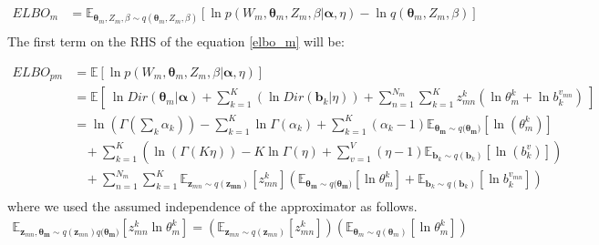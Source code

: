 \documentclass[a4]{article}
\begin{document}
\begin{equation}
\begin{aligned}
ELBO_m &= \mathbb{E}_{\bm{\theta}_m , Z_{m}, \beta \sim
                    q(\bm{\theta}_m , Z_{m}, \beta )}
            [    \ln p( W_m, \bm{\theta}_m, Z_m, \beta | \bm{\alpha}, \eta)
               - \ln q(\bm{\theta}_m , Z_{m}, \beta ) ]\label{elbo_m}\\
\end{aligned}
\end{equation}
The first term on the RHS of the equation \ref{elbo_m} will be:

\begin{equation}
\begin{aligned}
    ELBO_{pm}
    &=
    \mathbb{E}[\ln p( W_m, \bm{\theta}_m, Z_m, \beta | \bm{\alpha}, \eta )]\\
    &=
    \mathbb{E}\left[\:
       \ln Dir( \bm{\theta}_m | \bm{\alpha} ) +
       \sum_{k=1}^{K} \left( \ln Dir( \mathbf{b}_k | \eta ) \right) +
       \sum_{n=1}^{N_m}
           \sum_{k=1}^{K}
               z_{mn}^k \left( \ln \theta_m^k + \ln b_k^{v_{mn}} \right) 
       \:\right]\label{model_w}\\
    &=
      \ln \left( \Gamma( \sum_k \alpha_k ) \right) 
          - \sum_{k=1}^{K} \ln \Gamma(\alpha_k) 
          + \sum_{k=1}^{K} (\alpha_k - 1)
            \mathbb{E}_{\bm{\theta_m} \sim q(\bm{\theta_m)}}[\ln(\theta_m^k)]\\
      &\:\:\:\:+
      \sum_{k=1}^K \left(
          \ln \left( \Gamma( K\eta ) \right) 
          - K\ln \Gamma(\eta) 
          + \sum_{v=1}^{V} (\eta - 1) 
               \mathbb{E}_{\mathbf{b}_k \sim q(\mathbf{b}_k)}
               [\ln(b_k^v)]
      \right)\\
    &\:\:\:\:+
    \sum_{n=1}^{N_m} \sum_{k=1}^{K} 
        \mathbb{E}_{\mathbf{z}_{mn} \sim q(\mathbf{z_{mn}})} [z_{mn}^{k}] 
        \left(   \mathbb{E}_{\bm{\theta_m} \sim q(\bm{\theta_m)}}
                 [\ln \theta_m^k] 
               + \mathbb{E}_{\mathbf{b}_k \sim q(\mathbf{b}_k)}
                 [\ln b_{k}^{v_{mn}}] \right)\\
\end{aligned}
\end{equation}
where we used the assumed independence of the approximator as follows.
\begin{equation}
\begin{aligned}
\mathbb{E}_{ \mathbf{z}_{mn}, \bm{\theta_m} \sim 
    q(\mathbf{z}_{mn})q(\bm{\theta_m)} }
        [z_{mn}^{k} \ln \theta_m^k] 
=
    \left( \mathbb{E}_{\mathbf{z}_{mn} \sim q(\mathbf{z}_{mn})}
        [z_{mn}^{k}] \right)
    \left( \mathbb{E}_{\bm{\theta}_m \sim q(\bm{\theta}_m)}[\ln \theta_m^k]
    \right)\\
\end{aligned}
\end{equation}
\end{document}
